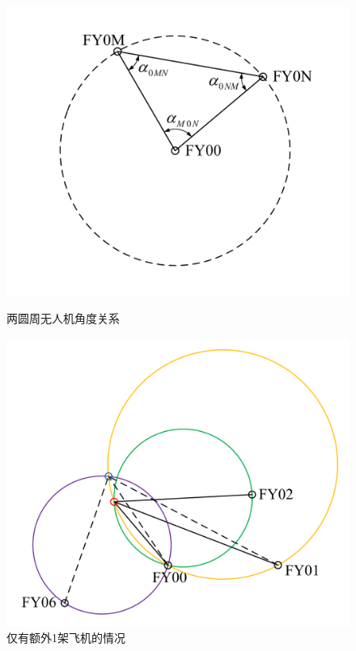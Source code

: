 \documentclass[12pt,AutoFakeSlant,AutoFakeBold]{article}
\begin{document}
\begin{figure}[!ht]
    \centering
    \begin{minipage}[t]{0.48\textwidth}
        \centering
        \includegraphics[width=\textwidth]{图片/问题1-2示意图1.pdf}
        \caption{两圆周无人机角度关系}
        \label{fig:问题1-2示意图1}
    \end{minipage}
    \begin{minipage}[t]{0.48\textwidth}
        \centering
        \includegraphics[width=\textwidth]{图片/问题1-2示意图2.pdf}
        \caption{仅有额外1架飞机的情况}
        \label{fig:额外1架飞机}
    \end{minipage}
\end{figure}
\end{document}
